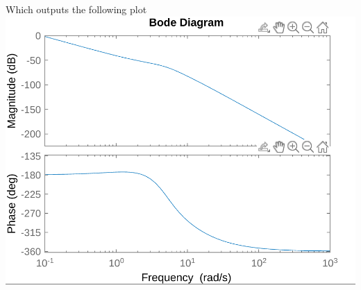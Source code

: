 \documentclass[12pt]{article}
\begin{document}
Which outputs the following plot\\
\includegraphics[scale=0.2]{Problem2Fig2.png}\\
\end{document}

